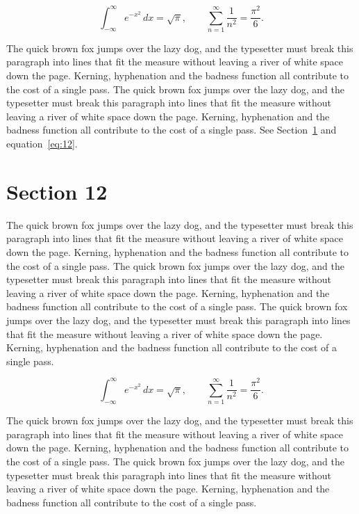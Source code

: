 \documentclass{article}
\begin{document}
\begin{equation}\label{eq:11}
\int_{-\infty}^{\infty} e^{-x^{2}}\,dx = \sqrt{\pi}, \qquad
\sum_{n=1}^{\infty} \frac{1}{n^{2}} = \frac{\pi^{2}}{6}.
\end{equation}

The quick brown fox jumps over the lazy dog, and the typesetter must break this paragraph into lines that fit the measure without leaving a river of white space down the page. Kerning, hyphenation and the badness function all contribute to the cost of a single pass. The quick brown fox jumps over the lazy dog, and the typesetter must break this paragraph into lines that fit the measure without leaving a river of white space down the page. Kerning, hyphenation and the badness function all contribute to the cost of a single pass. 
See Section~\ref{sec:12} and equation~\eqref{eq:12}.
\section{Section 12}
\label{sec:12}
The quick brown fox jumps over the lazy dog, and the typesetter must break this paragraph into lines that fit the measure without leaving a river of white space down the page. Kerning, hyphenation and the badness function all contribute to the cost of a single pass. The quick brown fox jumps over the lazy dog, and the typesetter must break this paragraph into lines that fit the measure without leaving a river of white space down the page. Kerning, hyphenation and the badness function all contribute to the cost of a single pass. The quick brown fox jumps over the lazy dog, and the typesetter must break this paragraph into lines that fit the measure without leaving a river of white space down the page. Kerning, hyphenation and the badness function all contribute to the cost of a single pass. 

\begin{equation}\label{eq:12}
\int_{-\infty}^{\infty} e^{-x^{2}}\,dx = \sqrt{\pi}, \qquad
\sum_{n=1}^{\infty} \frac{1}{n^{2}} = \frac{\pi^{2}}{6}.
\end{equation}

The quick brown fox jumps over the lazy dog, and the typesetter must break this paragraph into lines that fit the measure without leaving a river of white space down the page. Kerning, hyphenation and the badness function all contribute to the cost of a single pass. The quick brown fox jumps over the lazy dog, and the typesetter must break this paragraph into lines that fit the measure without leaving a river of white space down the page. Kerning, hyphenation and the badness function all contribute to the cost of a single pass. 
\end{document}
